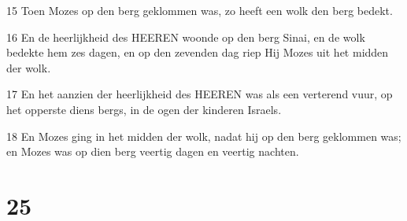 \par 15 Toen Mozes op den berg geklommen was, zo heeft een wolk den berg bedekt.
\par 16 En de heerlijkheid des HEEREN woonde op den berg Sinai, en de wolk bedekte hem zes dagen, en op den zevenden dag riep Hij Mozes uit het midden der wolk.
\par 17 En het aanzien der heerlijkheid des HEEREN was als een verterend vuur, op het opperste diens bergs, in de ogen der kinderen Israels.
\par 18 En Mozes ging in het midden der wolk, nadat hij op den berg geklommen was; en Mozes was op dien berg veertig dagen en veertig nachten.

\chapter{25}

